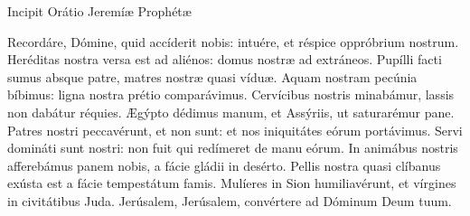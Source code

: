 
 \lesson

 Incipit Orátio Jeremíæ Prophétæ 


Recordáre, Dómine, quid accíderit nobis: intuére, et réspice oppróbrium
nostrum. Heréditas nostra versa est ad aliénos: domus nostræ ad extráneos.
Pupílli facti sumus absque patre, matres nostræ quasi víduæ. Aquam nostram
pecúnia bíbimus: ligna nostra prétio comparávimus. Cervícibus nostris
minabámur, lassis non dabátur réquies. Ægýpto dédimus manum, et Assýriis, ut
saturarémur pane. Patres nostri peccavérunt, et non sunt: et nos iniquitátes
eórum portávimus. Servi domináti sunt nostri: non fuit qui redímeret de manu
eórum. In animábus nostris afferebámus panem nobis, a fácie gládii in desérto.
Pellis nostra quasi clíbanus exústa est a fácie tempestátum famis. Mulíeres in
Sion humiliavérunt, et vírgines in civitátibus Juda. Jerúsalem, Jerúsalem,
convértere ad Dóminum Deum tuum.

